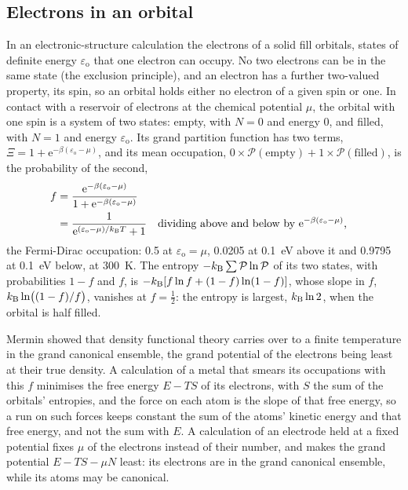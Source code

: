 \subsection*{Electrons in an orbital}

In an electronic-structure calculation the electrons of a solid fill
orbitals, states of definite energy $\varepsilon_{\mathrm o}$ that one electron can
occupy. No two electrons can be in the same state (the exclusion
principle), and an electron has a further two-valued property, its spin,
so an orbital holds either no electron of a given spin or one. In contact
with a reservoir of electrons at the chemical potential $\mu$, the orbital
with one spin is a system of two states: empty, with $N = 0$ and energy
0, and filled, with $N = 1$ and energy $\varepsilon_{\mathrm o}$. Its grand partition
function has two terms, $\Xi = 1 + \mathrm{e}^{-\beta(\varepsilon_{\mathrm o} -
\mu)}$, and its mean occupation, $0\times\mathcal{P}(\text{empty}) +
1\times\mathcal{P}(\text{filled})$, is the probability of the second,
\begin{align*}
   f &= \frac{\mathrm{e}^{-\beta(\varepsilon_{\mathrm o} - \mu)}}{1 +
   \mathrm{e}^{-\beta(\varepsilon_{\mathrm o} - \mu)}}\\
   &= \frac{1}{\mathrm{e}^{(\varepsilon_{\mathrm o} - \mu)/k_{\mathrm{B}} T} + 1}
   && \text{dividing above and below by
   $\mathrm{e}^{-\beta(\varepsilon_{\mathrm o} - \mu)}$,}
\end{align*}
the Fermi-Dirac occupation: 0.5 at $\varepsilon_{\mathrm o} = \mu$, 0.0205 at
\SI{0.1}{\electronvolt} above it and 0.9795 at \SI{0.1}{\electronvolt}
below, at \SI{300}{\kelvin}. The entropy $-k_{\mathrm{B}}\sum\mathcal{P}\ln\mathcal{P}$
of its two states, with probabilities $1 - f$ and $f$, is $-k_{\mathrm{B}}[f\ln f +
(1 - f)\ln(1 - f)]$, whose slope in $f$, $k_{\mathrm{B}}\ln\bigl((1 - f)/f\bigr)$,
vanishes at $f = \frac12$: the entropy is largest, $k_{\mathrm{B}}\ln 2$, when the
orbital is half filled.

\begin{bridge}
Mermin showed that density functional theory carries over to a finite
temperature in the grand canonical ensemble, the grand potential of the
electrons being least at their true density\cite{Mermin1965}. A
calculation of a metal that smears its occupations with this $f$
minimises the free energy $E - TS$ of its electrons, with $S$ the sum of
the orbitals' entropies, and the force on each atom is the slope of that
free energy, so a run on such forces keeps constant the sum of the atoms'
kinetic energy and that free energy\cite{Wentzcovitch1992}, and not the
sum with $E$. A calculation of an electrode held at a fixed potential
fixes $\mu$ of the electrons instead of their number, and makes the grand
potential $E - TS - \mu N$ least: its electrons are in the grand
canonical ensemble, while its atoms may be canonical.
\end{bridge}


